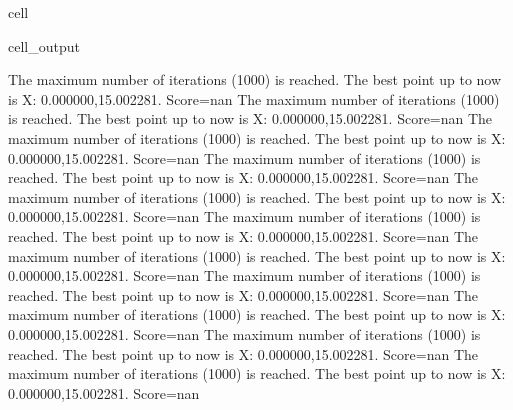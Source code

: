 \documentclass[letterpaper,10pt,english]{jupyterBook}
\begin{document}
\begin{sphinxuseclass}{cell}
\begin{sphinxVerbatimOutput}
\begin{sphinxuseclass}{cell_output}
\begin{sphinxVerbatim}[commandchars=\\\{\}]
The maximum number of iterations (1000) is reached. The best point up to now is X: \PYGZob{}0.000000,15.002281\PYGZcb{}. Score=\PYGZhy{}nan
The maximum number of iterations (1000) is reached. The best point up to now is X: \PYGZob{}0.000000,15.002281\PYGZcb{}. Score=\PYGZhy{}nan
The maximum number of iterations (1000) is reached. The best point up to now is X: \PYGZob{}0.000000,15.002281\PYGZcb{}. Score=\PYGZhy{}nan
The maximum number of iterations (1000) is reached. The best point up to now is X: \PYGZob{}0.000000,15.002281\PYGZcb{}. Score=\PYGZhy{}nan
The maximum number of iterations (1000) is reached. The best point up to now is X: \PYGZob{}0.000000,15.002281\PYGZcb{}. Score=\PYGZhy{}nan
The maximum number of iterations (1000) is reached. The best point up to now is X: \PYGZob{}0.000000,15.002281\PYGZcb{}. Score=\PYGZhy{}nan
The maximum number of iterations (1000) is reached. The best point up to now is X: \PYGZob{}0.000000,15.002281\PYGZcb{}. Score=\PYGZhy{}nan
The maximum number of iterations (1000) is reached. The best point up to now is X: \PYGZob{}0.000000,15.002281\PYGZcb{}. Score=\PYGZhy{}nan
The maximum number of iterations (1000) is reached. The best point up to now is X: \PYGZob{}0.000000,15.002281\PYGZcb{}. Score=\PYGZhy{}nan
The maximum number of iterations (1000) is reached. The best point up to now is X: \PYGZob{}0.000000,15.002281\PYGZcb{}. Score=\PYGZhy{}nan
The maximum number of iterations (1000) is reached. The best point up to now is X: \PYGZob{}0.000000,15.002281\PYGZcb{}. Score=\PYGZhy{}nan
\end{sphinxVerbatim}


\end{sphinxuseclass}
\end{sphinxVerbatimOutput}
\end{sphinxuseclass}
\end{document}
